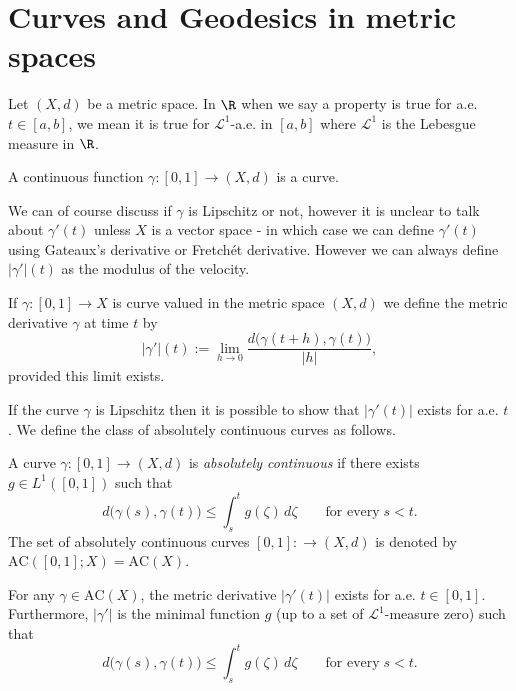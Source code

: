 \section{Curves and Geodesics in metric spaces}
Let $(X, d)$ be a metric space. In $\R$ when we say a property is true for a.e. $t\in [a,b]$, we mean it is true for $\mathcal{L}^1$-a.e. in $[a,b]$ where $\mathcal{L}^1$ is the Lebesgue measure in $\R$.

\begin{defn} A continuous function $\gamma:[0,1]\to (X,d)$ is a curve.
\end{defn}
We can of course discuss if $\gamma$ is Lipschitz or not, however it is unclear to talk about $\gamma'(t)$ unless $X$ is a vector space - in which case we can define $\gamma'(t)$ using Gateaux's derivative or Fretch\'et derivative. However we can always define $|\gamma'|(t)$ as the modulus of the velocity.

\begin{defn} If $\gamma:[0,1]\to X$ is curve valued in the metric space $(X,d)$ we define the metric derivative $\gamma$ at time $t$ by
\begin{equation*}
    |\gamma'|(t) := \lim_{h\to 0} \frac{d\big(\gamma(t+h), \gamma(t)\big)}{|h|},
\end{equation*}
provided this limit exists. 
\end{defn}

If the curve $\gamma$ is Lipschitz then it is possible to show that $|\gamma'(t)|$ exists for a.e. $t$. We define the class of absolutely continuous curves as follows.

\begin{defn} A curve $\gamma:[0,1]\to (X,d)$ is \emph{absolutely continuous} if there exists $g\in L^1([0,1])$ such that 
\begin{equation*}
    d\big(\gamma(s), \gamma(t)\big) \leq \int_s^t g(\zeta)\,d\zeta \qquad 
    \text{for every}\;s<t.
\end{equation*}
The set of absolutely continuous curves $[0,1]:\to (X,d)$ is denoted by $\mathrm{AC}([0,1];X)=\mathrm{AC}(X)$.
\end{defn}


\begin{thm} For any $\gamma\in \mathrm{AC}(X)$, the metric derivative $|\gamma'(t)|$ exists for a.e. $t\in [0,1]$. Furthermore, $|\gamma'|$ is the minimal function $g$ (up to a set of $\mathcal{L}^1$-measure zero) such that 
\begin{equation*}
    d\big(\gamma(s), \gamma(t)\big) \leq \int_s^t g(\zeta)\,d\zeta \qquad 
    \text{for every}\;s<t.
\end{equation*}
\end{thm}

